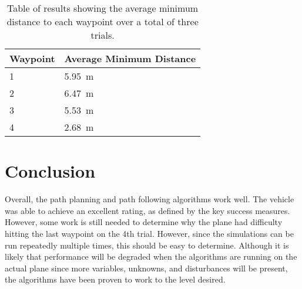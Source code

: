 \documentclass[]{auvsi_doc}
\begin{document}
\begin{table}[h!]

\caption{Table of results showing the average minimum distance to each waypoint over a total of three trials.}
\label{tab:hardware}
\begin{tabular} {|l|l|}
\hline
Waypoint & Average Minimum Distance\\
\hline
1 & 5.95~m\\
2 & 6.47~m\\
3& 5.53~m\\
4& 2.68~m\\
\hline
\end{tabular}
\end{table}



\section*{Conclusion}

Overall, the path planning and path following algorithms work well. The vehicle was able to achieve an excellent rating, as defined by the key success measures.
However, some work is still needed to determine why the plane had difficulty hitting the last waypoint on the 4th trial. However, since the simulations can be run repeatedly multiple times, this should be easy to determine.
Although it is likely that performance will be degraded when the algorithms are running on the actual plane since more variables, unknowns, and disturbances will be present, the algorithms have been proven to work to the level desired.

\end{document}
